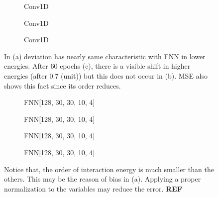 \documentclass[a4paper,times,12pt]{article}
\begin{document}
\begin{figure}[H]
    \centering
    \begin{subfigure}[t]{0.45\textwidth}
		\centering
        
        \caption{Conv1D}
		\label{fig:a}
    \end{subfigure}\hfill
    \begin{subfigure}[t]{0.45\textwidth}
		\centering
        
        \caption{Conv1D}
		\label{fig:b}
    \end{subfigure}\hfill    
    \begin{subfigure}[t]{0.45\textwidth}
        \centering
        
        \caption{Conv1D}
		\label{fig:c}
    \end{subfigure}
	\caption{In (a) deviation has nearly same characteristic with FNN in lower energies. After 60 epochs (c), there is a visible shift in higher energies (after 0.7 (unit)) but this does not occur in (b). MSE also shows this fact since its order reduces.}
\end{figure}

\begin{figure}[H]
    \centering
    \begin{subfigure}[t]{0.45\textwidth}
		\centering
        
        \caption{FNN[128, 30, 30, 10, 4]}
		\label{fig:a}
    \end{subfigure}\hfill
    \begin{subfigure}[t]{0.45\textwidth}
		\centering
        
        \caption{FNN[128, 30, 30, 10, 4]}
		\label{fig:b}
    \end{subfigure}\hfill    
    \begin{subfigure}[t]{0.45\textwidth}
        \centering
        
        \caption{FNN[128, 30, 30, 10, 4]}
		\label{fig:c}
    \end{subfigure}\hfill
    \begin{subfigure}[t]{0.45\textwidth}
        \centering
        
        \caption{FNN[128, 30, 30, 10, 4]}
		\label{fig:c}
    \end{subfigure}
	\caption{Notice that, the order of interaction energy is much smaller than the others. This may be the reason of bias in (a). Applying a proper normalization to the variables may reduce the error. \textbf{REF}}
\end{figure}
\end{document}
